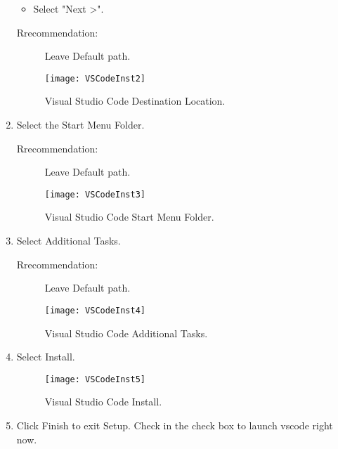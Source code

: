 \begin{enumerate}
\begin{itemize}
		\item Select "Next >".
	\end{itemize}
	\begin{description}
	\item[Rrecommendation: ] Leave Default path.
	\end{description}
	\begin{figure}  [H]
		\begin{center}
			\texttt{[image: VSCodeInst2]}
			\caption{Visual Studio Code Destination Location.} 
			\label{fig:Visual Studio Code Destination Location.}
		\end{center}
	\end{figure}
	\item Select the Start Menu Folder.
	\begin{description}
		\item[Rrecommendation: ] Leave Default path.
	\end{description}
	\begin{figure}  [H]
		\begin{center}
			\texttt{[image: VSCodeInst3]}
			\caption{Visual Studio Code Start Menu Folder.} 
			\label{fig:Visual Studio Code Start Menu Folder.}
		\end{center}
	\end{figure}
	\item Select Additional Tasks.
	\begin{description}
		\item[Rrecommendation: ] Leave Default path.
	\end{description}
	\begin{figure}  [H]
		\begin{center}
			\texttt{[image: VSCodeInst4]}
			\caption{Visual Studio Code Additional Tasks.} 
			\label{fig:Visual Studio Code Additional Tasks.}
		\end{center}
	\end{figure}
	\item Select Install.
	\begin{figure}  [H]
		\begin{center}
			\texttt{[image: VSCodeInst5]}
			\caption{Visual Studio Code Install.} 
			\label{fig:Visual Studio Code Install.}
		\end{center}
	\end{figure}
	\item Click Finish to exit Setup. Check in the check box to launch \ac{vscode} right now.
	\begin{figure}  [H]

\end{figure}
\end{enumerate}

